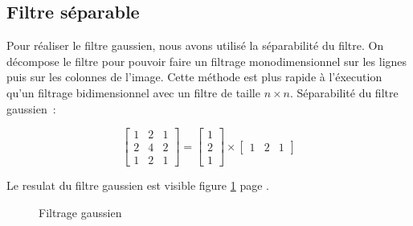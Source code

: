 \documentclass{article}
\begin{document}
\subsection{Filtre séparable}

Pour réaliser le filtre gaussien, nous avons utilisé la séparabilité du filtre. On décompose le filtre pour
pouvoir faire un filtrage monodimensionnel sur les lignes puis sur les colonnes de l'image. Cette méthode est plus
rapide à l'éxecution qu'un filtrage bidimensionnel avec un filtre de taille $n\times n$. Séparabilité du filtre
gaussien~:

\begin{equation}
\left[ \begin{array}{ccc}
        1 & 2 & 1 \\
        2 & 4 & 2 \\
        1 & 2 & 1 \end{array} \right] 
    =
 \left[ \begin{array}{c}
        1\\
        2\\
        1 \end{array} \right] 
    \times
 \left[ \begin{array}{ccc}
        1 & 2 & 1 \end{array} \right] 
\end{equation}

Le resulat du filtre gaussien est visible figure \ref{gauss:init} page \pageref{gauss:init}.

\begin{figure}[!ht]%
  \centering
  \hspace{0.030\textwidth}
  \caption{Filtrage gaussien}
  \label{gauss:init}
\end{figure}
\end{document}
